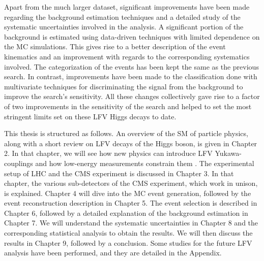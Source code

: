 Apart from the much larger dataset, significant improvements have been made regarding the background estimation techniques and a detailed study of the systematic uncertainties involved in the analysis. A significant portion of the background is estimated using data-driven techniques with limited dependence on the MC simulations. This gives rise to a better description of the event kinematics and an improvement with regards to the corresponding systematics involved. The categorization of the events has been kept the same as the previous search. In contrast, improvements have been made to the classification done with multivariate techniques for discriminating the signal from the background to improve the search's sensitivity. All these changes collectively gave rise to a factor of two improvements in the sensitivity of the search and helped to set the most stringent limits set on these LFV Higgs decays to date.

This thesis is structured as follows. An overview of the SM of particle physics, along with a short review on LFV decays of the Higgs boson, is given in Chapter 2. In that chapter, we will see how new physics can introduce LFV Yukawa-couplings and how low-energy measurements constrain them \cite{Harnik:2012pb}. The experimental setup of LHC and the CMS experiment is discussed in Chapter 3. In that chapter, the various sub-detectors of the CMS experiment, which work in unison, is explained. Chapter 4 will dive into the MC event generation, followed by the event reconstruction description in Chapter 5. The event selection is described in Chapter 6, followed by a detailed explanation of the background estimation in Chapter 7. We will understand the systematic uncertainties in Chapter 8 and the corresponding statistical analysis to obtain the results. We will then discuss the results in Chapter 9, followed by a conclusion. Some studies for the future LFV analysis have been performed, and they are detailed in the Appendix.
